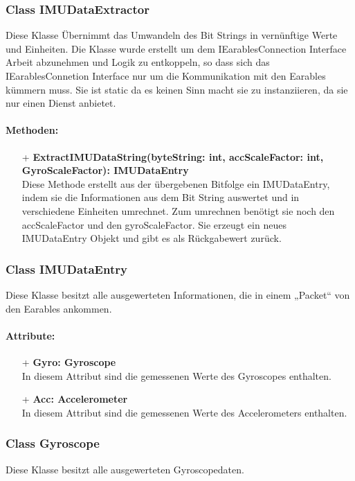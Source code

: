 \documentclass[a4paper,12pt]{article}
\begin{document}
\subsubsection{Class IMUDataExtractor}
Diese Klasse Übernimmt das Umwandeln des Bit Strings in vernünftige Werte und Einheiten.
Die Klasse wurde erstellt um dem IEarablesConnection Interface Arbeit abzunehmen und Logik zu entkoppeln, so dass sich das IEarablesConnetion
Interface nur um die Kommunikation mit den Earables kümmern muss. Sie ist static da es keinen Sinn macht sie zu instanziieren, da sie nur einen Dienst anbietet.

\paragraph{Methoden:}
\begin{itemize}
	\item[+] \textbf{ExtractIMUDataString(byteString: int, accScaleFactor: int, GyroScaleFactor): IMUDataEntry}\\Diese Methode erstellt aus der übergebenen Bitfolge ein IMUDataEntry, indem sie die Informationen aus dem Bit String auswertet und in verschiedene Einheiten umrechnet. Zum umrechnen benötigt sie noch den accScaleFactor und den gyroScaleFactor. Sie erzeugt ein neues IMUDataEntry Objekt und gibt es als Rückgabewert zurück.
\end{itemize}


\subsubsection{Class IMUDataEntry}
Diese Klasse besitzt alle ausgewerteten Informationen, die in einem „Packet“ von den Earables ankommen.

\paragraph{Attribute:}
\begin{itemize}
	\item[+] \textbf{Gyro: Gyroscope}\\In diesem Attribut sind die gemessenen Werte des Gyroscopes enthalten.
	\item[+] \textbf{Acc: Accelerometer}\\In diesem Attribut sind die gemessenen Werte des Accelerometers enthalten.
\end{itemize}


\subsubsection{Class Gyroscope}
Diese Klasse besitzt alle ausgewerteten Gyroscopedaten.
\end{document}
